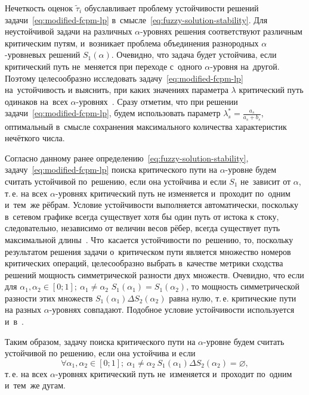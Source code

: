 Нечеткость оценок $\tilde{\tau}_i$ обуславливает проблему устойчивости решений задачи~\eqref{eq:modified-fcpm-lp} в~смысле~\eqref{eq:fuzzy-solution-stability}. Для неустойчивой задачи на различных $\alpha$-уровнях решения соответствуют различным критическим путям, и~возникает проблема объединения разнородных $\alpha$-уровневых решений $S_1\left(\alpha \right)$. Очевидно, что задача будет устойчива, если критический путь не~меняется при переходе с~одного $\alpha$-уровня на~другой. Поэтому целесообразно исследовать задачу~\eqref{eq:modified-fcpm-lp} на~устойчивость и выяснить, при каких значениях параметра $\lambda$ критический путь одинаков на~всех $\alpha$-уровнях~\cite{Vorontsov_VSTU}. Сразу отметим, что при решении задачи~\eqref{eq:modified-fcpm-lp}, будем использовать параметр $\displaystyle \lambda_{s}^{*}=\frac{a_s}{a_s+b_s}$, оптимальный в~смысле сохранения максимального количества характеристик нечёткого числа.

Согласно данному ранее определению~\eqref{eq:fuzzy-solution-stability}, задачу~\eqref{eq:modified-fcpm-lp} поиска критического пути на $\alpha$-уровне будем считать устойчивой по~решению, если она устойчива и если $S_1$ не~зависит от $\alpha$, т.\,е. на всех $\alpha$-уровнях критический путь не изменяется и~проходит по~одним и~тем~же рёбрам. Условие устойчивости выполняется автоматически, поскольку в~сетевом графике всегда существует хотя бы один путь от истока к стоку, следовательно, независимо от величин весов рёбер, всегда существует путь максимальной длины~\cite{Kormen}. Что~касается устойчивости по~решению, то, поскольку результатом решения задачи о~критическом пути является множество номеров критических операций, целесообразно выбрать в~качестве метрики сходства решений мощность симметрической разности двух множеств. Очевидно, что если для $\alpha_1, \alpha_2 \in \left[ 0;1 \right];\ \alpha_1\ne \alpha_2$ $S_1\left( \alpha_1 \right)=S_1\left(\alpha_2 \right)$, то мощность симметрической разности этих множеств $S_1\left( \alpha_1 \right)\Delta S_2\left(\alpha_2 \right)$ равна нулю, т.\,е. критические пути на разных $\alpha$-уровнях совпадают. Подобное условие устойчивости используется и~в~\cite{PhD_Starodubtsev}.

Таким образом, задачу поиска критического пути на $\alpha $-уровне будем считать устойчивой по решению, если она устойчива и если 
\begin{equation}
\label{eq:modified-cpm-lp-stability}
  \forall \alpha_1, \alpha_2\in \left[ 0;1 \right];\ \alpha_1\ne \alpha_2\ S_1\left(\alpha_1 \right)\Delta S_2\left(\alpha_2 \right)=\varnothing,
\end{equation}
т.\,е. на всех $\alpha $-уровнях критический путь не~изменяется и~проходит по~одним и~тем~же дугам. 

